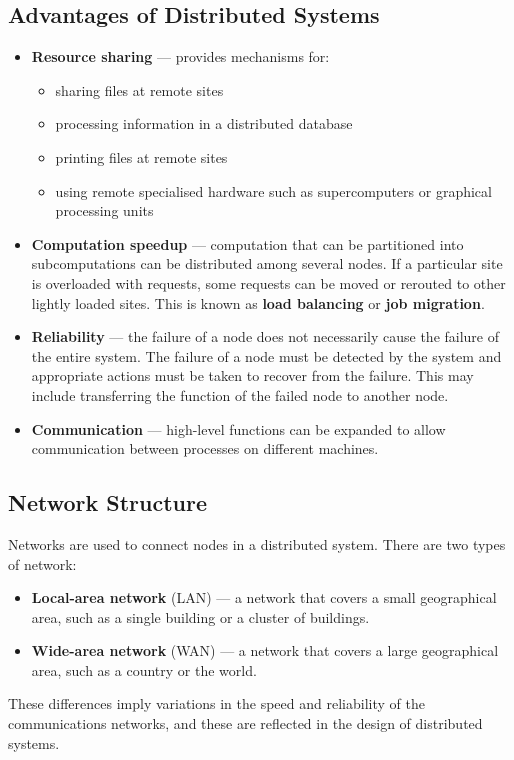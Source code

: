 \documentclass{article}
\begin{document}
\subsection{Advantages of Distributed Systems}
\begin{itemize}
    \item \textbf{Resource sharing} --- provides mechanisms for:
          \begin{itemize}
              \item sharing files at remote sites
              \item processing information in a distributed database
              \item printing files at remote sites
              \item using remote specialised hardware such as
                    supercomputers or graphical processing units
          \end{itemize}
    \item \textbf{Computation speedup} --- computation that can be
          partitioned into subcomputations can be distributed among several
          nodes. If a particular site is overloaded with requests, some
          requests can be moved or rerouted to other lightly loaded sites.
          This is known as \textbf{load balancing} or \textbf{job migration}.
    \item \textbf{Reliability} --- the failure of a node does not
          necessarily cause the failure of the entire system. The
          failure of a node must be detected by the system and
          appropriate actions must be taken to recover from the failure.
          This may include transferring the function of the failed node
          to another node.
    \item \textbf{Communication} --- high-level functions can be
          expanded to allow communication between processes on different
          machines.
\end{itemize}
\subsection{Network Structure}
Networks are used to connect nodes in a distributed system. There are
two types of network:
\begin{itemize}
    \item \textbf{Local-area network} (LAN) --- a network that covers
          a small geographical area, such as a single building or a
          cluster of buildings.
    \item \textbf{Wide-area network} (WAN) --- a network that covers
          a large geographical area, such as a country or the world.
\end{itemize}
These differences imply variations in the speed and reliability of the
communications networks, and these are reflected in the design of
distributed systems.
\end{document}
